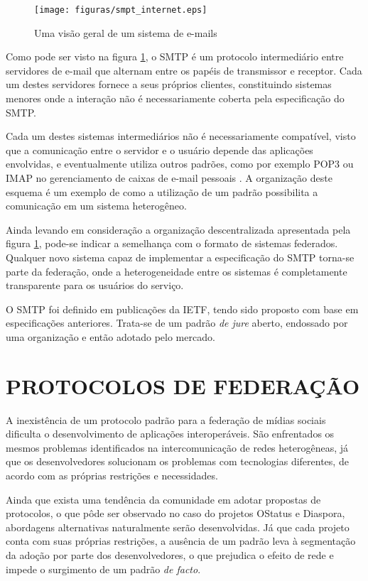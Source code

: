 \begin{figure}[h]
	\centering
		\texttt{[image: figuras/smpt\_internet.eps]}
	\caption{Uma visão geral de um sistema de e-mails \cite{kurose2012}}
	\label{fig:smtpInternet}
\end{figure}

Como pode ser visto na figura \ref{fig:smtpInternet}, o SMTP é um protocolo
intermediário entre servidores de e-mail que alternam entre os papéis de transmissor
e receptor. Cada um destes servidores fornece a seus próprios clientes, constituindo
sistemas menores onde a interação não é necessariamente coberta pela especificação
do SMTP.

Cada um destes sistemas intermediários não é necessariamente compatível, visto que a
comunicação entre o servidor e o usuário depende das aplicações envolvidas, e
eventualmente utiliza outros padrões, como por exemplo POP3 ou IMAP no gerenciamento
de caixas de e-mail pessoais \cite{tanenbaum2010}. A organização deste esquema é um
exemplo de como a utilização de um padrão possibilita a comunicação em um sistema
heterogêneo.

Ainda levando em consideração a organização descentralizada apresentada pela figura
\ref{fig:smtpInternet}, pode-se indicar a semelhança com o formato de sistemas
federados. Qualquer novo sistema capaz de implementar a especificação do SMTP
torna-se parte da federação, onde a heterogeneidade entre os sistemas é
completamente transparente para os usuários do serviço.

O SMTP foi definido em publicações da IETF, tendo sido proposto com base em
especificações anteriores. Trata-se de um padrão \textit{de jure} aberto, endossado
por uma organização e então adotado pelo mercado.



\section{PROTOCOLOS DE FEDERAÇÃO}


A inexistência de um protocolo padrão para a federação de mídias sociais dificulta
o desenvolvimento de aplicações interoperáveis. São enfrentados os mesmos problemas
identificados na intercomunicação de redes heterogêneas, já que os desenvolvedores
solucionam os problemas com tecnologias diferentes, de acordo com as próprias
restrições e necessidades.

Ainda que exista uma tendência da comunidade em adotar propostas de protocolos, o
que pôde ser observado no caso do projetos OStatus e Diaspora, abordagens
alternativas naturalmente serão desenvolvidas. Já que cada projeto conta com suas
próprias restrições, a ausência de um padrão leva à segmentação da adoção por parte
dos desenvolvedores, o que prejudica o efeito de rede e impede o surgimento de um
padrão \textit{de facto}.

